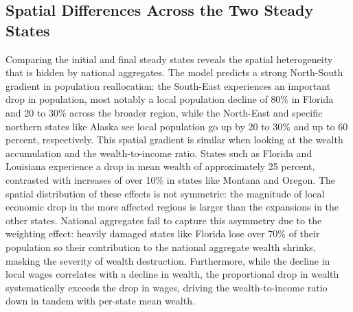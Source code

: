 \documentclass[11pt, a4paper]{article}
\begin{document}
\subsection{Spatial Differences Across the Two Steady States}
Comparing the initial and final steady states reveals the spatial heterogeneity that is hidden by national aggregates. The model predicts a strong North-South gradient in population reallocation: the South-East experiences an important drop in population, most notably a local population decline of 80\% in Florida and 20 to 30\% across the broader region, while the North-East and specific northern states like Alaska see local population go up by 20 to 30\% and up to 60 percent, respectively. 
This spatial gradient is similar when looking at the wealth accumulation and the wealth-to-income ratio. States such as Florida and Louisiana experience a drop in mean wealth of approximately 25 percent, contrasted with increases of over 10\% in states like Montana and Oregon. The spatial distribution of these effects is not symmetric: the magnitude of local economic drop in the more affected regions is larger than the expansions in the other states. National aggregates fail to capture this asymmetry due to the weighting effect: heavily damaged states like Florida lose over 70\% of their population so their contribution to the national aggregate wealth shrinks, masking the severity of wealth destruction. Furthermore, while the decline in local wages correlates with a decline in wealth, the proportional drop in wealth systematically exceeds the drop in wages, driving the wealth-to-income ratio down in tandem with per-state mean wealth. 
\end{document}
